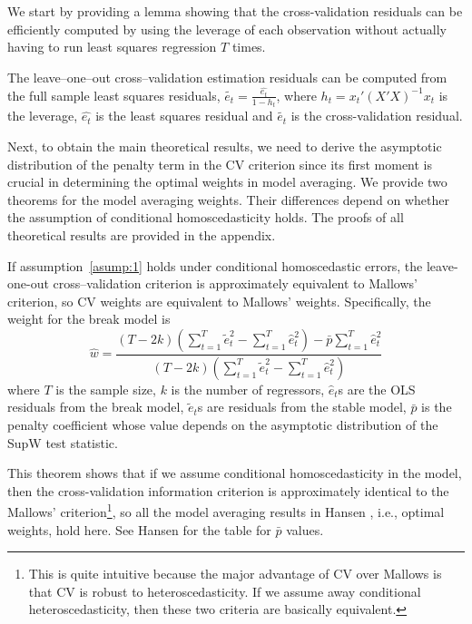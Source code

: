 We start by providing a lemma showing that the cross-validation residuals can be efficiently computed by using the leverage of each observation without actually having to run least squares regression $T$ times.
\begin{lemma} \label{lem:1}
The leave--one--out cross--validation estimation residuals can be computed from the full sample least squares residuals, $\tilde{e_t} = \frac{\hat{e_t}}{1-h_t}$, where $h_t = x_t' (X'X)^{-1} x_t$ is the leverage, $\hat{e_t}$ is the least squares residual and $\tilde{e_t}$ is the cross-validation residual.
\end{lemma}

Next, to obtain the main theoretical results, we need to derive the asymptotic distribution of the penalty term in the CV criterion since its first moment is crucial in determining the optimal weights in model averaging. We provide two theorems for the model averaging weights. Their differences depend on whether the assumption of conditional homoscedasticity holds. The proofs of all theoretical results are provided in the appendix.
\begin{theorem} \label{thm:1}
If assumption~\ref{asump:1} holds under conditional homoscedastic errors, the leave-one-out cross--validation criterion is approximately equivalent to Mallows' criterion, so CV weights are equivalent to Mallows' weights. Specifically, the weight for the break model is
\begin{equation}
\hat{w} = \frac{(T - 2k)(\sum_{t=1}^{T}\tilde{e}_{t}^{2} - \sum_{t=1}^{T}\hat{e}_{t}^{2}) - \bar{p}\sum_{t=1}^{T}\hat{e}_{t}^{2}}{(T - 2k)(\sum_{t=1}^{T}\tilde{e}_{t}^{2} - \sum_{t=1}^{T}\hat{e}_{t}^{2})}
\end{equation}
where $T$ is the sample size, $k$ is the number of regressors, $\hat{e}_t$s are the OLS residuals from the break model, $\tilde{e}_t$s are residuals from the stable model, $\bar{p}$ is the penalty coefficient whose value depends on the asymptotic distribution of the SupW test statistic.
\end{theorem}
This theorem shows that if we assume conditional homoscedasticity in the model, then the cross-validation information criterion is approximately identical to the Mallows' criterion\footnote{This is quite intuitive because the major advantage of CV over Mallows is that CV is robust to heteroscedasticity. If we assume away conditional heteroscedasticity, then these two criteria are basically equivalent.}, so all the model averaging results in Hansen \cite{hansen2009averaging}, i.e., optimal weights, hold here. See Hansen \cite{hansen2009averaging} for the table for $\bar{p}$ values.

